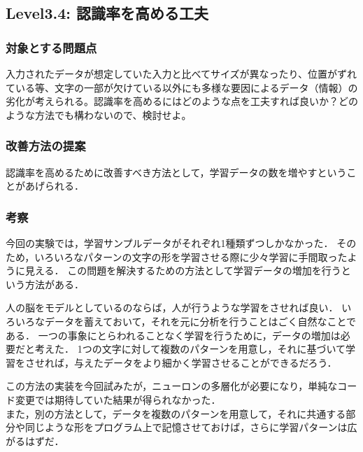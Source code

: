 \subsection{Level3.4: 認識率を高める工夫}
\subsubsection{対象とする問題点}
入力されたデータが想定していた入力と比べてサイズが異なったり、位置がずれている等、文字の一部が欠けている以外にも多様な要因によるデータ（情報）の劣化が考えられる。認識率を高めるにはどのような点を工夫すれば良いか？どのような方法でも構わないので、検討せよ。

\subsubsection{改善方法の提案}
認識率を高めるために改善すべき方法として，学習データの数を増やすということがあげられる．

\subsubsection{考察}
今回の実験では，学習サンプルデータがそれぞれ1種類ずつしかなかった．
そのため，いろいろなパターンの文字の形を学習させる際に少々学習に手間取ったように見える．
この問題を解決するための方法として学習データの増加を行うという方法がある．

人の脳をモデルとしているのならば，人が行うような学習をさせれば良い．
いろいろなデータを蓄えておいて，それを元に分析を行うことはごく自然なことである．
一つの事象にとらわれることなく学習を行うために，データの増加は必要だと考えた．
1つの文字に対して複数のパターンを用意し，それに基づいて学習をさせれば，与えたデータをより細かく学習させることができるだろう．

この方法の実装を今回試みたが，ニューロンの多層化が必要になり，単純なコード変更では期待していた結果が得られなかった．\\

また，別の方法として，データを複数のパターンを用意して，それに共通する部分や同じような形をプログラム上で記憶させておけば，さらに学習パターンは広がるはずだ．